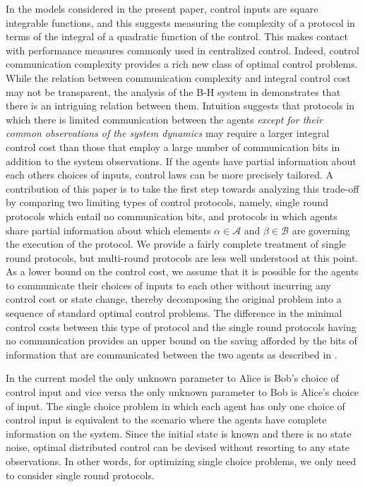 \documentclass[12pt,onecolumn,draftcls]{IEEEtran}
\newcommand{\cA}{\mathcal{A}}
\newcommand{\cB}{\mathcal{B}}
\begin{document}
In the models considered in the present paper, control inputs are square integrable functions, and this suggests measuring the complexity of a protocol in terms of the integral of a quadratic function of the control.   This makes contact with performance measures commonly used in centralized control.  Indeed, control communication complexity provides a rich new class of optimal control problems. 
While the relation between communication complexity and integral control cost may not be transparent,
the analysis of the B-H system in \cite{WB} demonstrates that there is an intriguing relation between them.   
Intuition suggests that protocols in which there is limited communication between the agents {\em except for their common observations of the system dynamics} may require a larger integral control cost than those that employ
a large number of communication bits in addition to the system observations.  If the agents have partial information about each others choices of inputs, control laws can be more precisely tailored.
A contribution of this paper is to take the first step towards analyzing this trade-off
by comparing two limiting types of control protocols, namely, single round protocols
which entail no communication bits, and protocols in which agents share partial information about which elements $\alpha\in\cA$ and $\beta\in\cB$ are governing the execution of the protocol.  We provide a fairly complete treatment of single round protocols, but multi-round protocols are less well understood at this point.   As a lower bound on the control cost, we assume that it is possible for the agents to communicate their choices  of inputs to each other without incurring any control cost or state change,
thereby decomposing the original problem into a sequence of standard optimal control problems.   The difference in the minimal control
costs between this type of protocol and the single round protocols having no communication provides an upper bound on the saving afforded by the bits of information that are communicated between the two agents as described in \cite{Wong}. 

In the current model the only unknown parameter to Alice is Bob's choice of control input and vice versa
the only unknown parameter to Bob is Alice's choice of input.  The single choice problem in which each agent has only one choice of control input is equivalent to the scenario where the agents have complete information on
the system.   Since the initial state is known and there is no state noise, optimal distributed control can be devised without
resorting to any state observations.  In other words, for optimizing single choice  problems,
we only need to consider single round protocols.  
\end{document}
